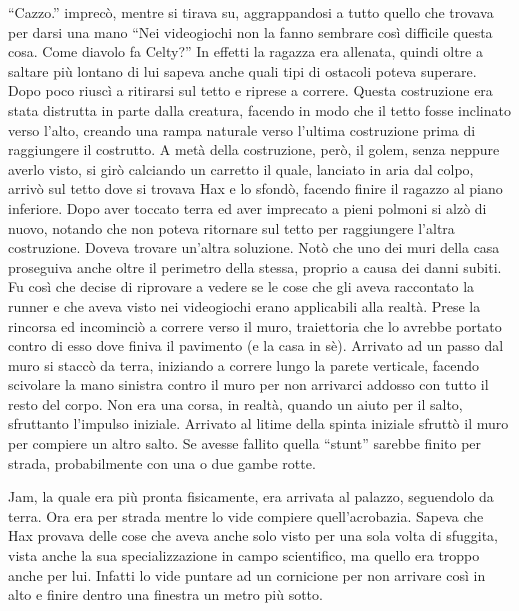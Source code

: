     ``Cazzo.'' imprecò, mentre si tirava su, aggrappandosi a tutto quello
    che trovava per darsi una mano ``Nei videogiochi non la fanno sembrare
    così difficile questa cosa. Come diavolo fa Celty?'' In effetti la
    ragazza era allenata, quindi oltre a saltare più lontano di lui sapeva
    anche quali tipi di ostacoli poteva superare. Dopo poco riuscì a
    ritirarsi sul tetto e riprese a correre. Questa costruzione era stata
    distrutta in parte dalla creatura, facendo in modo che il tetto fosse
    inclinato verso l'alto, creando una rampa naturale verso l'ultima
    costruzione prima di raggiungere il costrutto. A metà della
    costruzione, però, il golem, senza neppure averlo visto, si girò
    calciando un carretto il quale, lanciato in aria dal colpo, arrivò sul
    tetto dove si trovava Hax e lo sfondò, facendo finire il ragazzo al
    piano inferiore. Dopo aver toccato terra ed aver imprecato a pieni
    polmoni si alzò di nuovo, notando che non poteva ritornare sul tetto
    per raggiungere l'altra costruzione. Doveva trovare un'altra soluzione.
    Notò che uno dei muri della casa proseguiva anche oltre il perimetro
    della stessa, proprio a causa dei danni subiti. Fu così che decise di
    riprovare a vedere se le cose che gli aveva raccontato la runner e che
    aveva visto nei videogiochi erano applicabili alla realtà. Prese la
    rincorsa ed incominciò a correre verso il muro, traiettoria che lo
    avrebbe portato contro di esso dove finiva il pavimento (e la casa in
    sè). Arrivato ad un passo dal muro si staccò da terra, iniziando a
    correre lungo la parete verticale, facendo scivolare la mano sinistra
    contro il muro per non arrivarci addosso con tutto il resto del corpo.
    Non era una corsa, in realtà, quando un aiuto
    per il salto, sfruttanto l'impulso iniziale. Arrivato al litime della
    spinta iniziale sfruttò il muro per compiere un altro salto. Se avesse
    fallito quella ``stunt'' sarebbe finito per strada, probabilmente con
    una o due gambe rotte.

    Jam, la quale era più pronta fisicamente, era arrivata al palazzo,
    seguendolo da terra. Ora era per strada mentre lo vide compiere
    quell'acrobazia. Sapeva che Hax provava delle cose che aveva anche solo
    visto per una sola volta di sfuggita, vista anche la sua
    specializzazione in campo scientifico, ma quello era troppo anche per
    lui. Infatti lo vide puntare ad un cornicione per non arrivare così in
    alto e finire dentro una finestra un metro più sotto.

